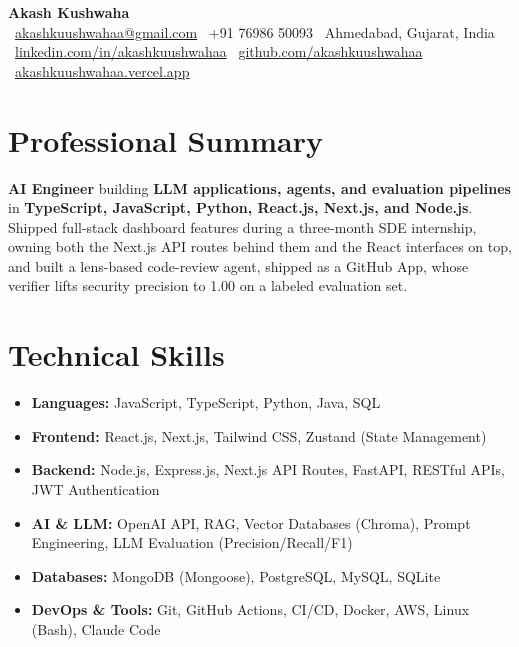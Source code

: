\documentclass[11pt,a4paper,sans]{moderncv}
\providecommand{\faMapMarker}{\faLocationDot}
\begin{document}
\begin{center}
    {\Huge\bfseries Akash Kushwaha}\\[1.2ex]\small
    \faEnvelope\ \href{mailto:akashkuushwahaa@gmail.com}{akashkuushwahaa@gmail.com}\quad\textbar\quad
    \faPhone\ +91 76986 50093\quad\textbar\quad
    \faMapMarker\ Ahmedabad, Gujarat, India\\[0.5ex]
    \faLinkedin\ \href{https://linkedin.com/in/akashkuushwahaa}{linkedin.com/in/akashkuushwahaa} \quad\textbar\quad
    \faGithub\ \href{https://github.com/akashkuushwahaa}{github.com/akashkuushwahaa} \quad\textbar\quad
    \faGlobe\ \href{https://akashkuushwahaa.vercel.app}{akashkuushwahaa.vercel.app}
\end{center}

\section{Professional Summary}
\textbf{AI Engineer} building \textbf{LLM applications, agents, and evaluation pipelines} in \textbf{TypeScript, JavaScript, Python, React.js, Next.js, and Node.js}. Shipped full-stack dashboard features during a three-month SDE internship, owning both the Next.js API routes behind them and the React interfaces on top, and built a lens-based code-review agent, shipped as a GitHub App, whose verifier lifts security precision to 1.00 on a labeled evaluation set.

\section{Technical Skills}
\begin{itemize}
  \item \textbf{Languages:} JavaScript, TypeScript, Python, Java, SQL
  \item \textbf{Frontend:} React.js, Next.js, Tailwind CSS, Zustand (State Management)
  \item \textbf{Backend:} Node.js, Express.js, Next.js API Routes, FastAPI, RESTful APIs, JWT Authentication
  \item \textbf{AI \& LLM:} OpenAI API, RAG, Vector Databases (Chroma), Prompt Engineering, LLM Evaluation (Precision/Recall/F1)
  \item \textbf{Databases:} MongoDB (Mongoose), PostgreSQL, MySQL, SQLite
  \item \textbf{DevOps \& Tools:} Git, GitHub Actions, CI/CD, Docker, AWS, Linux (Bash), Claude Code
\end{itemize}
\end{document}
